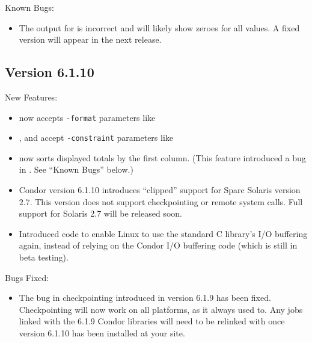 \noindent Known Bugs:

\begin{itemize}

\item The output for   is incorrect and will likely show
zeroes for all values.  A fixed version will appear in the next release.

\end{itemize}

\subsection{\label{sec:New-6-1-10}Version 6.1.10}

\noindent New Features:

\begin{itemize}

\item {} now accepts \texttt{-format} parameters like 

\item {},  and  accept
  \texttt{-constraint} parameters like 

\item {} now sorts displayed totals by the first column.
(This feature introduced a bug in .  See ``Known Bugs''
below.)

\item Condor version 6.1.10 introduces ``clipped'' support for Sparc
Solaris version 2.7.
This version does not support checkpointing or remote system calls.
Full support for Solaris 2.7 will be released soon.

\item Introduced code to enable Linux to use the standard C library's
I/O buffering again, instead of relying on the Condor I/O buffering
code (which is still in beta testing).  

\end{itemize}

\noindent Bugs Fixed:

\begin{itemize}

\item The bug in checkpointing introduced in version 6.1.9 has been
fixed.
Checkpointing will now work on all platforms, as it always used to.  
Any jobs linked with the 6.1.9 Condor libraries will need to be
relinked with  once version 6.1.10 has been installed
at your site. 

\end{itemize}

